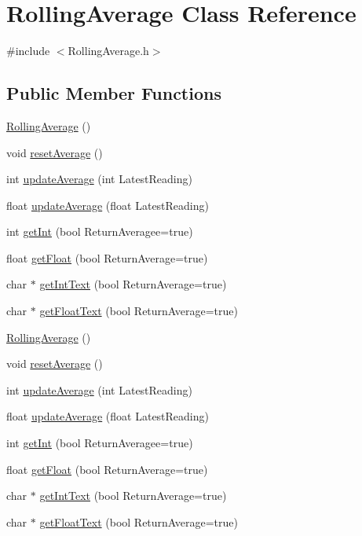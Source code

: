 \hypertarget{class_rolling_average}{}\section{Rolling\+Average Class Reference}
\label{class_rolling_average}


{\ttfamily \#include $<$Rolling\+Average.\+h$>$}

\subsection*{Public Member Functions}
\begin{DoxyCompactItemize}
\item 
\hyperlink{class_rolling_average_ae87ed45e2fb2c7a8209382095916a245}{Rolling\+Average} ()
\item 
void \hyperlink{class_rolling_average_a5413499ba156dd5acec73196edfda3d4}{reset\+Average} ()
\item 
int \hyperlink{class_rolling_average_aa1fd09fa8d80046179ed7ed91bfed6d0}{update\+Average} (int Latest\+Reading)
\item 
float \hyperlink{class_rolling_average_a8b3550acbd16b942b565150334205d52}{update\+Average} (float Latest\+Reading)
\item 
int \hyperlink{class_rolling_average_a4fc812fc5b678f41c4a01d79c7fc5923}{get\+Int} (bool Return\+Averagee=true)
\item 
float \hyperlink{class_rolling_average_ada0ea15c7152230f9433329fba92d3f8}{get\+Float} (bool Return\+Average=true)
\item 
char $\ast$ \hyperlink{class_rolling_average_a7b7015bd5a39e953983f73330b3d8c87}{get\+Int\+Text} (bool Return\+Average=true)
\item 
char $\ast$ \hyperlink{class_rolling_average_aab001a981060af0948bd8b46c05c8e97}{get\+Float\+Text} (bool Return\+Average=true)
\item 
\hyperlink{class_rolling_average_ae87ed45e2fb2c7a8209382095916a245}{Rolling\+Average} ()
\item 
void \hyperlink{class_rolling_average_a5413499ba156dd5acec73196edfda3d4}{reset\+Average} ()
\item 
int \hyperlink{class_rolling_average_aa1fd09fa8d80046179ed7ed91bfed6d0}{update\+Average} (int Latest\+Reading)
\item 
float \hyperlink{class_rolling_average_a8b3550acbd16b942b565150334205d52}{update\+Average} (float Latest\+Reading)
\item 
int \hyperlink{class_rolling_average_a4fc812fc5b678f41c4a01d79c7fc5923}{get\+Int} (bool Return\+Averagee=true)
\item 
float \hyperlink{class_rolling_average_ada0ea15c7152230f9433329fba92d3f8}{get\+Float} (bool Return\+Average=true)
\item 
char $\ast$ \hyperlink{class_rolling_average_ac65c44e9f3900539e6305a3af6605de1}{get\+Int\+Text} (bool Return\+Average=true)
\item 
char $\ast$ \hyperlink{class_rolling_average_a045fc2bb9fe445bad004dd05e5bd6564}{get\+Float\+Text} (bool Return\+Average=true)
\end{DoxyCompactItemize}


